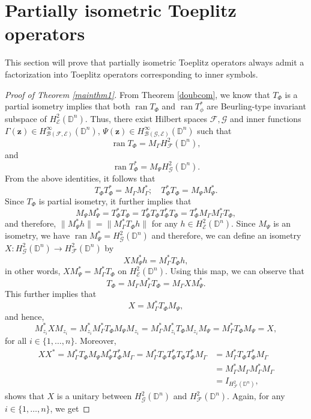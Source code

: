 \documentclass[12pt]{amsart}
\theoremstyle{definition}
\newcommand{\D}{\mathbb{D}}
\DeclareMathOperator{\ran}{ran}
\newcommand{\1}{{\mbox{\bf 1}}}
\newcommand{\clb}{\mathcal{B}}
\newcommand{\cle}{\mathcal{E}}
\newcommand{\clf}{\mathcal{F}}
\newcommand{\clg}{\mathcal{G}}
\newcommand{\raro}{\rightarrow}
\begin{document}
\section{Partially isometric Toeplitz operators}\label{partial}
This section will prove that partially isometric Toeplitz operators always admit a factorization into Toeplitz operators corresponding to inner symbols.
\begin{proof}[Proof of Theorem \ref{mainthm1}]
From Theorem \ref{doubcom}, we know that $T_{\Phi}$ is a partial isometry implies that both $\ran T_{\Phi}$ and $\ran T_{\phi}^*$ are Beurling-type invariant subspace of $H_{\cle}^2(\D^n)$.  Thus, there exist Hilbert spaces $\clf, \clg$ and inner functions $\Gamma(\bm{z}) \in H_{\clb(\clf, \cle)}^{\infty}(\D^n)$, $\Psi(\bm{z}) \in H_{\clb(\clg, \cle)}^{\infty}(\D^n)$ such that 
\[
\ran T_{\Phi} = M_{\Gamma} H_{\clf}^2(\D^n),
\]
and 
\[
\ran T_{\Phi}^* = M_{\Psi} H_{\clg}^2(\D^n).
\]
From the above identities, it follows that
\[
T_{\Phi} T_{\Phi}^* = M_{\Gamma}M_{\Gamma}^*; \quad T_{\Phi}^* T_{\Phi} = M_{\Psi}M_{\Psi}^*.
\]
Since $T_{\Phi}$ is partial isometry, it further implies that 
\[
M_{\Psi}M_{\Psi}^* = T_{\Phi}^*T_{\Phi} = T_{\Phi}^* T_{\Phi} T_{\Phi}^* T_{\Phi} = T_{\Phi}^* M_{\Gamma}M_{\Gamma}^* T_{\Phi},
\]
and therefore, $\|M_{\Psi}^* h\| = \|M_{\Gamma}^* T_{\Phi} h \|$ for any $h \in H_{\cle}^2(\D^n)$. Since $M_{\Psi}$ is an isometry, we have $\ran M_{\Psi}^* = H_{\clg}^2(\D^n)$ and therefore, we can define an isometry $X: H_{\clg}^2(\D^n) \raro H_{\clf}^2(\D^n)$ by 
\[
X M_{\Psi}^* h = M_{\Gamma}^* T_{\Phi} h,
\]
in other words, $X M_{\Psi}^* = M_{\Gamma}^* T_{\Phi}$ on $H_{\cle}^2(\D^n)$.  Using this map, we can observe that
\[
T_{\Phi} = M_{\Gamma}  M_{\Gamma}^* T_{\Phi} = M_{\Gamma}  X M_{\Psi}^*.
\]
This further implies that
\[
X = M_{\Gamma}^* T_{\Phi} M_{\Psi},
\]
and hence, 
\[
M_{z_i}^* X M_{z_i} = M_{z_i}^* M_{\Gamma}^* T_{\Phi} M_{\Psi} M_{z_i} =  M_{\Gamma}^* M_{z_i}^* T_{\Phi} M_{z_i} M_{\Psi}= M_{\Gamma}^* T_{\Phi} M_{\Psi}  = X,
\]
for all $i \in \{1,\ldots,n\}$. Moreover, 
\begin{align*}
XX^* = M_{\Gamma}^* T_{\Phi} M_{\Psi} M_{\Psi}^* T_{\Phi}^* M_{\Gamma}  = M_{\Gamma}^* T_{\Phi} T_{\Phi}^* T_{\Phi} T_{\Phi}^* M_{\Gamma} &= M_{\Gamma}^* T_{\Phi} T_{\Phi}^* M_{\Gamma} \\
&= M_{\Gamma}^* M_{\Gamma} M_{\Gamma}^* M_{\Gamma} \\
&= I_{H_{\clf}^2(\D^n)},
\end{align*}
shows that $X$ is a unitary between $H_{\clg}^2(\D^n)$ and $H_{\clf}^2(\D^n)$. Again, for any $i \in \{1,\ldots,n\}$, we get

\end{proof}
\end{document}
